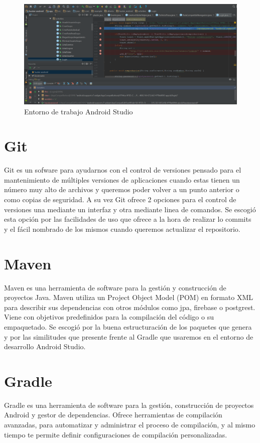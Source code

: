 \begin{figure}[H]
		\centering
		\includegraphics[width=1\textwidth] {debug.png}
		\caption{Entorno de trabajo Android Studio }
	\end{figure}


\section{Git}
Git es un sofware para ayudarnos con el control de versiones  pensado para el mantenimiento de múltiples versiones de aplicaciones cuando estas tienen un número muy alto de archivos y queremos poder volver a un punto anterior o como copias de seguridad. A su vez Git ofrece 2 opciones para el control de versiones una mediante un interfaz y otra mediante linea de comandos. Se escogió esta opción por las facilidades de uso que ofrece a la hora de realizar lo commits y el fácil nombrado de los mismos cuando queremos actualizar el repositorio.
\section{Maven}
Maven es una herramienta de software para la gestión y construcción de proyectos Java.
 Maven utiliza un Project Object Model (POM) en formato
XML para describir sus dependencias con otros módulos como jpa, firebase o postgrest. Viene con objetivos predefinidos para la compilación del código o su empaquetado. Se escogió por la buena estructuración de los paquetes que genera y por las similitudes que presente frente al Gradle que usaremos en el entorno de desarrollo Android Studio.




\section{Gradle}
Gradle es una herramienta de software para la gestión, construcción de proyectos Android y gestor de dependencias. Ofrece
  herramientas de compilación avanzadas, para automatizar y administrar el proceso de compilación, y al mismo tiempo te permite definir configuraciones de compilación personalizadas.



